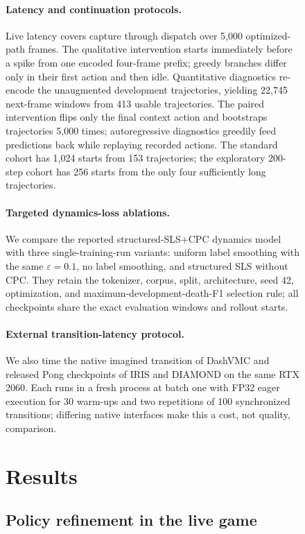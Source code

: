 \begin{figure}[!htbp]
\paragraph{Latency and continuation protocols.}
Live latency covers capture through dispatch over 5,000 optimized-path frames.
The qualitative intervention starts immediately before a spike from one encoded four-frame prefix; greedy branches differ only in their first action and then idle.
Quantitative diagnostics re-encode the unaugmented development trajectories, yielding 22,745 next-frame windows from 413 usable trajectories.
The paired intervention flips only the final context action and bootstraps trajectories 5,000 times; autoregressive diagnostics greedily feed predictions back while replaying recorded actions.
The standard cohort has 1,024 starts from 153 trajectories; the exploratory 200-step cohort has 256 starts from the only four sufficiently long trajectories.

\paragraph{Targeted dynamics-loss ablations.}
We compare the reported structured-SLS+CPC dynamics model with three single-training-run variants: uniform label smoothing with the same \(\varepsilon=0.1\), no label smoothing, and structured SLS without CPC.
They retain the tokenizer, corpus, split, architecture, seed 42, optimization, and maximum-development-death-F1 selection rule; all checkpoints share the exact evaluation windows and rollout starts.

\paragraph{External transition-latency protocol.}
We also time the native imagined transition of DashVMC and released Pong checkpoints of IRIS and DIAMOND on the same RTX 2060.
Each runs in a fresh process at batch one with FP32 eager execution for 30 warm-ups and two repetitions of 100 synchronized transitions; differing native interfaces make this a cost, not quality, comparison.

\FloatBarrier
\section{Results}
\label{sec:results}

\subsection{Policy refinement in the live game}
\label{sec:gd-results}


\end{figure}
